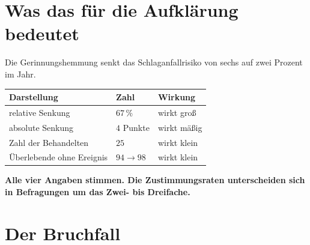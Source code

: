 \section{Was das für die Aufklärung bedeutet}

\begin{merksatz}
Die Gerinnungshemmung senkt das Schlaganfallrisiko von sechs auf zwei Prozent im Jahr.

\begin{center}
{\small
\renewcommand{\arraystretch}{1.5}
\begin{tabular}{@{}P{3.2cm}P{2.4cm}P{2.6cm}@{}}
\toprule
\textbf{Darstellung} & \textbf{Zahl} & \textbf{Wirkung}\\
\midrule
relative Senkung & $67\,\%$ & wirkt groß\\
absolute Senkung & $4$ Punkte & wirkt mäßig\\
Zahl der Behandelten & $25$ & wirkt klein\\
Überlebende ohne Ereignis & $94 \to 98$ & wirkt klein\\
\bottomrule
\end{tabular}}
\end{center}

\begin{center}
\begin{minipage}{0.9\textwidth}
\textbf{Alle vier Angaben stimmen. Die Zustimmungsraten unterscheiden sich in Befragungen um das Zwei- bis Dreifache.}
\end{minipage}
\end{center}

\begin{center}
\begin{minipage}{0.88\textwidth}
\end{minipage}
\end{center}
\end{merksatz}

\section{Der Bruchfall}


